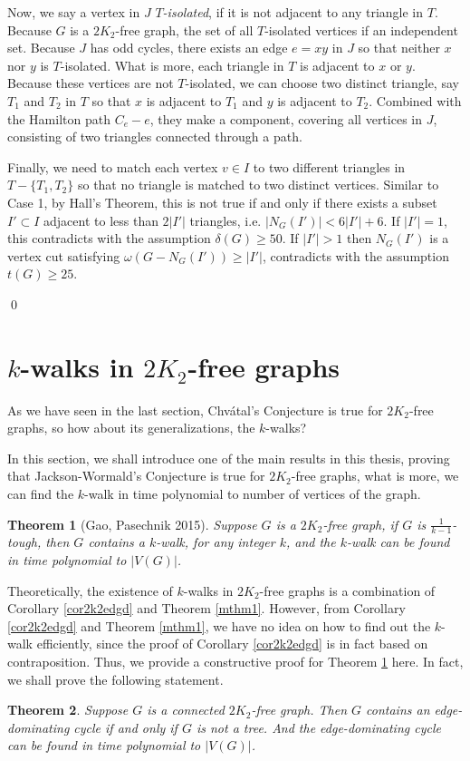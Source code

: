 \documentclass[12pt]{report}
\newtheorem{theorem}{Theorem}
\begin{document}
Now, we say a vertex in $J$ {\em $T$-isolated}, if it is not adjacent to any triangle in $T$. Because $G$ is a $2K_2$-free graph, the set of all $T$-isolated vertices if an independent set. Because $J$ has odd cycles, there exists an edge $e=xy$ in $J$ so that neither $x$ nor $y$ is $T$-isolated.  What is more, each triangle in $T$ is adjacent to $x$ or $y$. Because these vertices are not $T$-isolated, we can choose two distinct triangle, say $T_1$ and $T_2$ in $T$ so that $x$ is adjacent to $T_1$ and $y$ is adjacent to $T_2$. Combined with the Hamilton path $C_e-e$, they make a component, covering all vertices in $J$, consisting of two triangles connected through a path.

Finally, we need to match each vertex $v\in I$ to two different triangles in $T-\{T_1,T_2\}$ so that no triangle is matched to two distinct vertices. Similar to Case 1, by Hall's Theorem, this is not true if and only if there exists a subset $I'\subset I$ adjacent to less than $2|I'|$ triangles, i.e. $|N_G(I')|<6|I'|+6$. If $|I'|=1$, this contradicts with the assumption $\delta(G)\ge50$. If $|I'|>1$ then $N_G(I')$  is a vertex cut satisfying $\omega(G-N_G(I'))\ge|I'|$, contradicts with the assumption $t(G)\ge25$.

\qed






\section{$k$-walks in $2K_2$-free graphs}\label{sec54kw2k2}
As we have seen in the last section, Chv{\'a}tal's Conjecture is true for $2K_2$-free graphs, so how about its generalizations, the $k$-walks?

In this section, we shall introduce one of the main results in this thesis, proving that Jackson-Wormald's Conjecture is true for $2K_2$-free graphs, what is more, we can find the $k$-walk in time polynomial to number of vertices of the graph.

\begin{theorem}[Gao, Pasechnik 2015]\label{mthm2kwin2kpol}
Suppose $G$ is a $2K_2$-free graph, if $G$ is $\frac{1}{k-1}$-tough, then $G$ contains a $k$-walk, for any integer $k$, and the $k$-walk can be found in time polynomial to $|V(G)|$.
\end{theorem}

Theoretically, the existence of $k$-walks in $2K_2$-free graphs is a combination of Corollary \ref{cor2k2edgd} and Theorem \ref{mthm1}. However, from Corollary \ref{cor2k2edgd} and Theorem \ref{mthm1}, we have no idea on how to find out the $k$-walk efficiently, since the proof of Corollary \ref{cor2k2edgd} is in fact based on contraposition. Thus, we provide a constructive proof for Theorem \ref{mthm2kwin2kpol} here. In fact, we shall prove the following statement.
\begin{theorem}\label{cothm2kwin2kpol}
Suppose $G$ is a connected $2K_2$-free graph. Then $G$ contains an edge-dominating cycle if and only if $G$ is not a tree. And the edge-dominating cycle can be found in time polynomial to $|V(G)|$.
\end{theorem}
\end{document}
